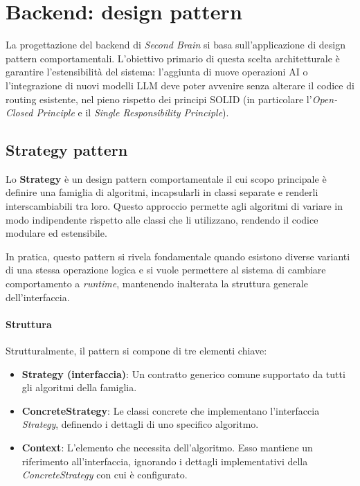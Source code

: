 \documentclass[11pt,a4paper]{article}
\begin{document}
\newpage

\section{Backend: design pattern}
La progettazione del backend di \textit{Second Brain} si basa sull'applicazione di design pattern comportamentali. L'obiettivo primario di questa scelta architetturale è garantire l'estensibilità del sistema: l'aggiunta di nuove operazioni AI o l'integrazione di nuovi modelli LLM deve poter avvenire senza alterare il codice di routing esistente, nel pieno rispetto dei principi SOLID (in particolare l'\textit{Open-Closed Principle} e il \textit{Single Responsibility Principle}).

\subsection{Strategy pattern}
Lo \textbf{Strategy} è un design pattern comportamentale il cui scopo principale è definire una famiglia di algoritmi, incapsularli in classi separate e renderli interscambiabili tra loro. Questo approccio permette agli algoritmi di variare in modo indipendente rispetto alle classi che li utilizzano, rendendo il codice modulare ed estensibile.

In pratica, questo pattern si rivela fondamentale quando esistono diverse varianti di una stessa operazione logica e si vuole permettere al sistema di cambiare comportamento a \textit{runtime}, mantenendo inalterata la struttura generale dell'interfaccia.

\paragraph{Struttura}
Strutturalmente, il pattern si compone di tre elementi chiave:
\begin{itemize}
    \item \textbf{Strategy (interfaccia)}: Un contratto generico comune supportato da tutti gli algoritmi della famiglia.
    \item \textbf{ConcreteStrategy}: Le classi concrete che implementano l'interfaccia \textit{Strategy}, definendo i dettagli di uno specifico algoritmo.
    \item \textbf{Context}: L'elemento che necessita dell'algoritmo. Esso mantiene un riferimento all'interfaccia, ignorando i dettagli implementativi della \textit{ConcreteStrategy} con cui è configurato.
\end{itemize}
\end{document}
